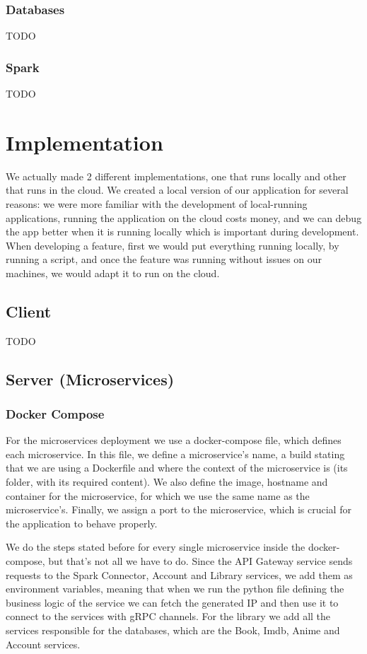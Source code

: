 \documentclass[oneside]{article}
\newcommand*\fpar{\hspace{1ex}}
\begin{document}
    \subsubsection{Databases}
    \fpar TODO

    \subsubsection{Spark}
    \fpar TODO

\section{Implementation}
\label{sec:implementation}
\fpar We actually made 2 different implementations, one that runs locally and other that runs in the cloud. We created a local version of our application for several reasons: we were more familiar with the development of local-running applications, running the application on the cloud costs money, and we can debug the app better when it is running locally which is important during development. When developing a feature, first we would put everything running locally, by running a script, and once the feature was running without issues on our machines, we would adapt it to run on the cloud.

    \subsection{Client}
    \fpar TODO

    \subsection{Server (Microservices)}
      \subsubsection{Docker Compose}
      \fpar For the microservices deployment we use a docker-compose file, which defines each microservice. In this file, we define a microservice's name, a build stating that we are using a Dockerfile and where the context of the microservice is (its folder, with its required content). We also define the image, hostname and container for the microservice, for which we use the same name as the microservice's. Finally, we assign a port to the microservice, which is crucial for the application to behave properly.
      \par We do the steps stated before for every single microservice inside the docker-compose, but that's not all we have to do. Since the API Gateway service sends requests to the Spark Connector, Account and Library services, we add them as environment variables, meaning that when we run the python file defining the business logic of the service we can fetch the generated IP and then use it to connect to the services with gRPC channels. For the library we add all the services responsible for the databases, which are the Book, Imdb, Anime and Account services.
\end{document}
